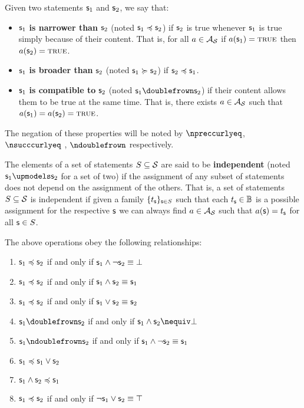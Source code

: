 \documentclass[11pt,letterpaper,fleqn]{memoir} %
\begin{document}
\begin{mathSection}

\begin{defn}\label{def_statement_narrowness_and_compatibility}
	Given two statements $\mathsf{s}_1$ and $\mathsf{s}_2$, we say that:
	\begin{itemize}
		\item $\mathsf{s}_1$ \textbf{is narrower than} $\mathsf{s}_2$ (noted $\mathsf{s}_1 \preccurlyeq \mathsf{s}_2$) if $\mathsf{s}_2$ is true whenever $\mathsf{s}_1$ is true simply because of their content. That is, for all $a \in \mathcal{A}_{\mathcal{S}}$ if $a(\mathsf{s}_1)=\textsc{true}$ then $a(\mathsf{s}_2)=\textsc{true}$.
		\item $\mathsf{s}_1$ \textbf{is broader than} $\mathsf{s}_2$ (noted $\mathsf{s}_1 \succcurlyeq \mathsf{s}_2$) if $\mathsf{s}_2 \preccurlyeq \mathsf{s}_1$.
		\item $\mathsf{s}_1$ \textbf{is compatible to} $\mathsf{s}_2$ (noted $\stmt_1 \comp \stmt_2$) if their content allows them to be true at the same time. That is, there exists $a \in \mathcal{A}_{\mathcal{S}}$ such that $a(\mathsf{s}_1)=a(\mathsf{s}_2)=\textsc{true}$.
	\end{itemize}
	The negation of these properties will be noted by $\nnarrower$, $\nbroader$ , $\ncomp$ respectively.
\end{defn}
\begin{defn}\label{def_independent_statements}
	The elements of a set of statements $S \subseteq \mathcal{S}$ are said to be \textbf{independent} (noted $\stmt_1 \indep \stmt_2$ for a set of two) if the assignment of any subset of statements does not depend on the assignment of the others. That is, a set of statements $S \subseteq \mathcal{S}$ is independent if given a family  $\{t_{\mathsf{s}}\}_{\mathsf{s} \in S}$ such that each $t_{\mathsf{s}} \in \mathbb{B}$ is a possible assignment for the respective $\mathsf{s}$ we can always find $a \in \mathcal{A}_{\mathcal{S}}$ such that $a(\mathsf{s}) = t_{\mathsf{s}}$ for all $\mathsf{s} \in S$.
\end{defn}

\begin{prop}\label{prop_narrowness_properties}
	The above operations obey the following relationships:
	\begin{enumerate}[label=(\roman*)]
		\item 	$\mathsf{s}_1 \preccurlyeq \mathsf{s}_2$ if and only if $\mathsf{s}_1 \wedge \neg \mathsf{s}_2 \equiv \bot$
		\item 	$\mathsf{s}_1 \preccurlyeq \mathsf{s}_2$ if and only if $\mathsf{s}_1 \wedge \mathsf{s}_2 \equiv \mathsf{s}_1$
		\item 	$\mathsf{s}_1 \preccurlyeq \mathsf{s}_2$ if and only if $\mathsf{s}_1 \vee \mathsf{s}_2 \equiv \mathsf{s}_2$
		\item 	$\stmt_1 \comp \stmt_2$ if and only if $\stmt_1 \AND \stmt_2 \nequiv \contradiction$
		\item 	$\stmt_1 \ncomp \stmt_2$ if and only if $\mathsf{s}_1 \wedge \neg \mathsf{s}_2 \equiv \mathsf{s}_1$
		\item 	$\mathsf{s}_1 \preccurlyeq \mathsf{s}_1 \vee \mathsf{s}_2$
		\item 	$\mathsf{s}_1 \wedge \mathsf{s}_2 \preccurlyeq \mathsf{s}_1$
		\item 	$\mathsf{s}_1 \preccurlyeq \mathsf{s}_2$ if and only if $\neg \mathsf{s}_1 \vee \mathsf{s}_2 \equiv \top$
	\end{enumerate}	
\end{prop}


\end{mathSection}
\end{document}
